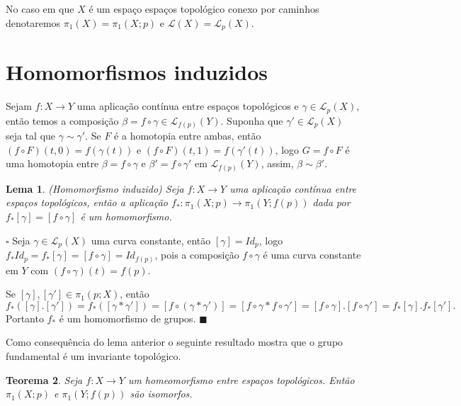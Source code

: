 \documentclass[12pt]{book}
\newtheorem{teorema}{Teorema}[section]
\newtheorem{lema}[teorema]{Lema}
\newenvironment{prova}[1]{$\square$ #1}{\hfill$\blacksquare$}
\newcommand{\caminhos}{\mathcal{L}}
\newcommand{\caminhossempontobase}[1]{\caminhos(#1)}
\newcommand{\caminhospontobasegeral}[2]{\caminhos_{#1}(#2)}
\newcommand{\classe}[1]{[#1]}
\newcommand{\grupofundamental}[1]{\pi_{1}(#1)}
\newcommand{\grupofundamentalpontobase}[2]{\pi_{1}(#1; #2)}
\begin{document}
	No caso em que $X$ é um espaço espaços topológico conexo por caminhos denotaremos $\grupofundamental{X}=\grupofundamentalpontobase{X}{p}$ e $\caminhossempontobase{X}=\caminhospontobasegeral{p}{X}$.
	
	\section{Homomorfismos induzidos}
	Sejam $f:X\to Y$ uma aplicação contínua entre espaços topológicos e $\gamma \in \caminhospontobasegeral{p}{X}$, então temos a composição $\beta=f\circ \gamma \in \caminhospontobasegeral{f(p)}{Y}$. Suponha que $\gamma' \in \caminhospontobasegeral{p}{X}$ seja tal que $\gamma \sim \gamma'$. Se $F$ é a homotopia entre ambas, então $(f\circ F)(t,0) =  f(\gamma(t))$ e $(f\circ F)(t,1) =  f(\gamma'(t)) $, logo $G=f\circ F$ é uma homotopia entre $\beta=f\circ \gamma$ e $\beta' = f\circ \gamma'$ em $\caminhospontobasegeral{f(p)}{Y}$, assim, $\beta \sim \beta'$.
	
	\begin{lema}
		(Homomorfismo induzido) Seja $f:X\to Y$ uma aplicação contínua entre espaços topológicos, então a aplicação $f_{*}:\grupofundamentalpontobase{X}{p} \to \grupofundamentalpontobase{Y}{f(p)}$ dada por $f_{*}\classe{\gamma} = \classe{f\circ\gamma}$ é um homomorfismo.
	\end{lema}
	\begin{prova}
		Seja $\gamma \in \caminhospontobasegeral{p}{X}$ uma curva constante, então $\classe{\gamma} = Id_{p}$, logo $f_{*}Id_{p} = f_{*}\classe{\gamma} = \classe{f\circ\gamma} = Id_{f(p)}$, pois a composição $f\circ\gamma$ é uma curva constante em $Y$ com $(f\circ\gamma)(t) = f(p)$.
		
		Se $\classe{\gamma}, \classe{\gamma'}\in \grupofundamentalpontobase{p}{X}$, então 
		$$
		f_{*}(\classe{\gamma}.\classe{\gamma'}) = f_{*}(\classe{\gamma*\gamma'}) = \classe{f\circ(\gamma*\gamma')} = \classe{f\circ\gamma*f\circ\gamma'} =
		\classe{f\circ\gamma}.\classe{f\circ\gamma'}=	f_{*}\classe{\gamma}.f_{*}\classe{\gamma'}.
		$$
		Portanto $f_{*}$ é um homomorfismo de grupos.
	\end{prova}
	
	Como consequência do lema anterior o seguinte resultado mostra que o grupo fundamental é um invariante topológico.
	\begin{teorema}
		Seja $f:X\to Y$ um homeomorfismo entre espaços topológicos. Então $\grupofundamentalpontobase{X}{p}$ e $\grupofundamentalpontobase{Y}{f(p)}$ são isomorfos.
	\end{teorema}
	
\end{document}
